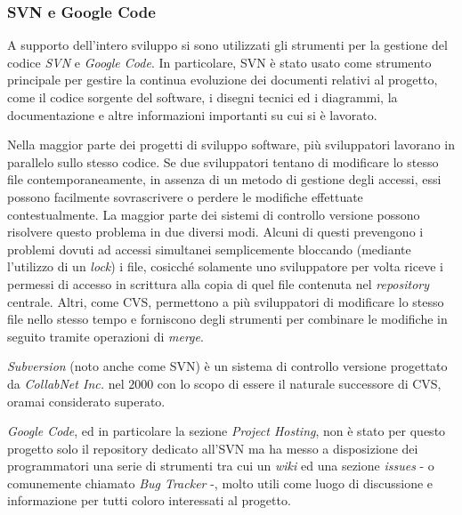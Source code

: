 \subsubsection{SVN e Google Code}
A supporto dell'intero sviluppo si sono utilizzati gli strumenti per la gestione del codice \textit{SVN} e \textit{Google Code}.
In particolare, SVN è stato usato come strumento principale per gestire la continua evoluzione dei documenti relativi al progetto, come il codice sorgente del software, i disegni tecnici ed i diagrammi, la documentazione e altre informazioni importanti su cui si è lavorato.

Nella maggior parte dei progetti di sviluppo software, più sviluppatori lavorano in parallelo sullo stesso codice. Se due sviluppatori tentano di modificare lo stesso file contemporaneamente, in assenza di un metodo di gestione degli accessi, essi possono facilmente sovrascrivere o perdere le modifiche effettuate contestualmente.
La maggior parte dei sistemi di controllo versione possono risolvere questo problema in due diversi modi. Alcuni di questi prevengono i problemi dovuti ad accessi simultanei semplicemente bloccando (mediante l'utilizzo di un \textit{lock}) i file, cosicché solamente uno sviluppatore per volta riceve i permessi di accesso in scrittura alla copia di quel file contenuta nel \textit{repository} centrale. Altri, come CVS, permettono a più sviluppatori di modificare lo stesso file nello stesso tempo e forniscono degli strumenti per combinare le modifiche in seguito tramite operazioni di \emph{merge}.

\emph{Subversion} (noto anche come SVN) è un sistema di controllo versione progettato da \textit{CollabNet Inc.} nel $2000$ con lo scopo di essere il naturale successore di CVS, oramai considerato superato.

\textit{Google Code}, ed in particolare la sezione \textit{Project Hosting}, non è stato per questo progetto solo il repository dedicato all'SVN ma ha messo a disposizione dei programmatori una serie di strumenti tra cui un \textit{wiki} ed una sezione \textit{issues} - o comunemente chiamato \emph{Bug Tracker} -, molto utili come luogo di discussione e informazione per tutti coloro interessati al progetto.

